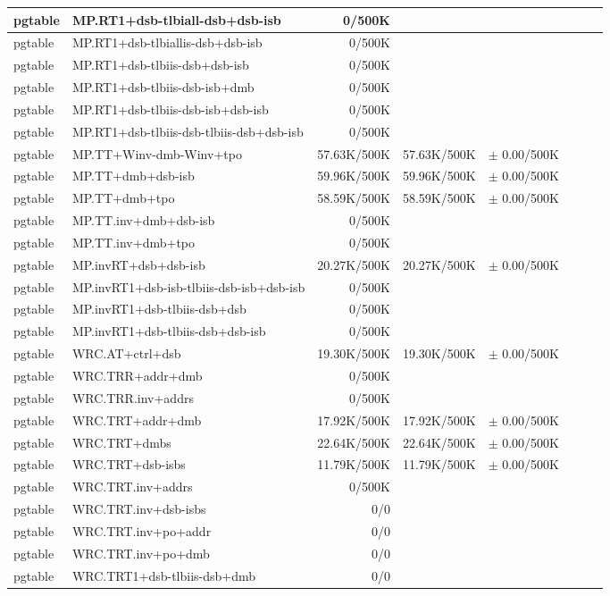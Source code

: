 \begin{tabular}{l l  | r r l | r r l}
\hline
   pgtable&MP.RT1+dsb-tlbiall-dsb+dsb-isb&0/500K&&&\\
\hline
   pgtable&MP.RT1+dsb-tlbiallis-dsb+dsb-isb&0/500K&&&\\
\hline
   pgtable&MP.RT1+dsb-tlbiis-dsb+dsb-isb&0/500K&&&\\
\hline
   pgtable&MP.RT1+dsb-tlbiis-dsb-isb+dmb&0/500K&&&\\
\hline
   pgtable&MP.RT1+dsb-tlbiis-dsb-isb+dsb-isb&0/500K&&&\\
\hline
   pgtable&MP.RT1+dsb-tlbiis-dsb-tlbiis-dsb+dsb-isb&0/500K&&&\\
\hline
   pgtable&MP.TT+Winv-dmb-Winv+tpo&57.63K/500K&57.63K/500K&$\pm$ 0.00/500K&\\
\hline
   pgtable&MP.TT+dmb+dsb-isb&59.96K/500K&59.96K/500K&$\pm$ 0.00/500K&\\
\hline
   pgtable&MP.TT+dmb+tpo&58.59K/500K&58.59K/500K&$\pm$ 0.00/500K&\\
\hline
   pgtable&MP.TT.inv+dmb+dsb-isb&0/500K&&&\\
\hline
   pgtable&MP.TT.inv+dmb+tpo&0/500K&&&\\
\hline
   pgtable&MP.invRT+dsb+dsb-isb&20.27K/500K&20.27K/500K&$\pm$ 0.00/500K&\\
\hline
   pgtable&MP.invRT1+dsb-isb-tlbiis-dsb-isb+dsb-isb&0/500K&&&\\
\hline
   pgtable&MP.invRT1+dsb-tlbiis-dsb+dsb&0/500K&&&\\
\hline
   pgtable&MP.invRT1+dsb-tlbiis-dsb+dsb-isb&0/500K&&&\\
\hline
   pgtable&WRC.AT+ctrl+dsb&19.30K/500K&19.30K/500K&$\pm$ 0.00/500K&\\
\hline
   pgtable&WRC.TRR+addr+dmb&0/500K&&&\\
\hline
   pgtable&WRC.TRR.inv+addrs&0/500K&&&\\
\hline
   pgtable&WRC.TRT+addr+dmb&17.92K/500K&17.92K/500K&$\pm$ 0.00/500K&\\
\hline
   pgtable&WRC.TRT+dmbs&22.64K/500K&22.64K/500K&$\pm$ 0.00/500K&\\
\hline
   pgtable&WRC.TRT+dsb-isbs&11.79K/500K&11.79K/500K&$\pm$ 0.00/500K&\\
\hline
   pgtable&WRC.TRT.inv+addrs&0/500K&&&\\
\hline
   pgtable&WRC.TRT.inv+dsb-isbs&0/0&&&\\
\hline
   pgtable&WRC.TRT.inv+po+addr&0/0&&&\\
\hline
   pgtable&WRC.TRT.inv+po+dmb&0/0&&&\\
\hline
   pgtable&WRC.TRT1+dsb-tlbiis-dsb+dmb&0/0&&&\\

\end{tabular}
